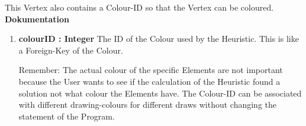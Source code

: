 \documentclass{article}
\begin{document}
				This Vertex also contains a Colour-ID so that the Vertex can be coloured.
				\textbf{Dokumentation}\newline
				\begin{enumerate}[-]
					\item{
						\textbf{colourID : Integer} \newline
						The ID of the Colour used by the Heuristic.
						This is like a Foreign-Key of the Colour.
						
						Remember:
						The actual colour of the specific Elements are not important because the User wants to see if the calculation of the Heuristic found a solution not what colour the Elements have.
						The Colour-ID can be associated with different drawing-colours for different draws without changing the statement of the Program.
					}
				\end{enumerate}	
\end{document}
